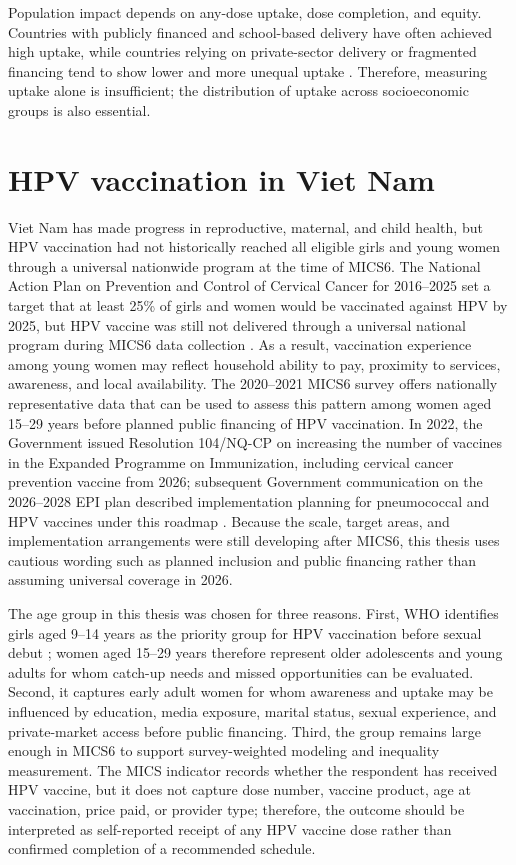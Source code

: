 Population impact depends on any-dose uptake, dose completion, and equity. Countries with publicly financed and school-based delivery have often achieved high uptake, while countries relying on private-sector delivery or fragmented financing tend to show lower and more unequal uptake \cite{bruni2021,gallagher2018}. Therefore, measuring uptake alone is insufficient; the distribution of uptake across socioeconomic groups is also essential.

\section{HPV vaccination in Viet Nam}

Viet Nam has made progress in reproductive, maternal, and child health, but HPV vaccination had not historically reached all eligible girls and young women through a universal nationwide program at the time of MICS6. The National Action Plan on Prevention and Control of Cervical Cancer for 2016--2025 set a target that at least 25\% of girls and women would be vaccinated against HPV by 2025, but HPV vaccine was still not delivered through a universal national program during MICS6 data collection \cite{mohunfpa2016actionplan,unicef2022}. As a result, vaccination experience among young women may reflect household ability to pay, proximity to services, awareness, and local availability. The 2020--2021 MICS6 survey offers nationally representative data that can be used to assess this pattern among women aged 15--29 years before planned public financing of HPV vaccination. In 2022, the Government issued Resolution 104/NQ-CP on increasing the number of vaccines in the Expanded Programme on Immunization, including cervical cancer prevention vaccine from 2026; subsequent Government communication on the 2026--2028 EPI plan described implementation planning for pneumococcal and HPV vaccines under this roadmap \cite{govvn2022nq104,baochinhphu2025epi}. Because the scale, target areas, and implementation arrangements were still developing after MICS6, this thesis uses cautious wording such as planned inclusion and public financing rather than assuming universal coverage in 2026.

The age group in this thesis was chosen for three reasons. First, WHO identifies girls aged 9--14 years as the priority group for HPV vaccination before sexual debut \cite{who2025cervicalcancer,who2022hpv}; women aged 15--29 years therefore represent older adolescents and young adults for whom catch-up needs and missed opportunities can be evaluated. Second, it captures early adult women for whom awareness and uptake may be influenced by education, media exposure, marital status, sexual experience, and private-market access before public financing. Third, the group remains large enough in MICS6 to support survey-weighted modeling and inequality measurement. The MICS indicator records whether the respondent has received HPV vaccine, but it does not capture dose number, vaccine product, age at vaccination, price paid, or provider type; therefore, the outcome should be interpreted as self-reported receipt of any HPV vaccine dose rather than confirmed completion of a recommended schedule.

